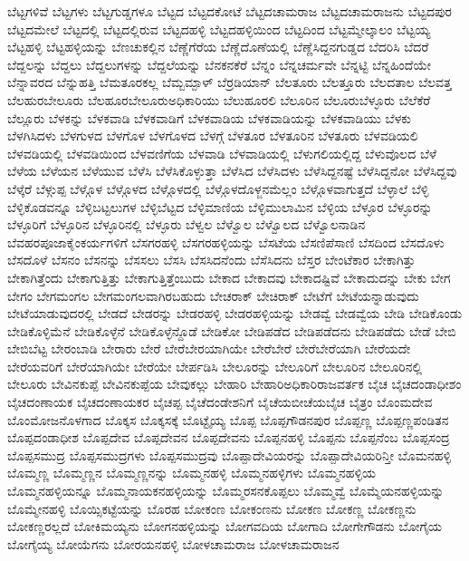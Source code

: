 {ಬೆಟ್ಟಗಳಿವೆ
ಬೆಟ್ಟಗಳು
ಬೆಟ್ಟಗುಡ್ಡಗಳೂ
ಬೆಟ್ಟದ
ಬೆಟ್ಟದಕೋಟೆ
ಬೆಟ್ಟದಚಾಮರಾಜ
ಬೆಟ್ಟದಚಾಮರಾಜನು
ಬೆಟ್ಟದಪುರ
ಬೆಟ್ಟದಮೇಲೆ
ಬೆಟ್ಟದಲ್ಲಿ
ಬೆಟ್ಟದಲ್ಲಿರುವ
ಬೆಟ್ಟದಹಳ್ಳಿ
ಬೆಟ್ಟದಹಳ್ಳಿಯಿಂದ
ಬೆಟ್ಟದಿಂದ
ಬೆಟ್ಟಮ್ಮೇಲ್ಕಾಲಂ
ಬೆಟ್ಟಯ್ಯ
ಬೆಟ್ಟಹಳ್ಳಿ
ಬೆಟ್ಟಹಳ್ಳಿಯನ್ನು
ಬೆಣಚುಕಲ್ಲಿನ
ಬೆಣ್ಣೆಗೆರೆಯ
ಬೆಣ್ಣೆದೊಣೆಯಲ್ಲಿ
ಬೆಣ್ಣೆಸಿದ್ದನಗುಡ್ಡದ
ಬೆದರಿಸಿ
ಬೆದರೆ
ಬೆದ್ದಲನ್ನು
ಬೆದ್ದಲು
ಬೆದ್ದಲುಗಳನ್ನು
ಬೆದ್ದಲೆಯನ್ನು
ಬೆನಕನಕೆರೆ
ಬೆನ್ನಂ
ಬೆನ್ನಚರ್ಮವೇ
ಬೆನ್ನಟ್ಟಿ
ಬೆನ್ನಹಿಂದೆಯೇ
ಬೆನ್ನಾವರದ
ಬೆನ್ನುಹತ್ತಿ
ಬೆಮತೂರಕಲ್ಲ
ಬೆಮ್ಬಮ್ಪಾಳ್
ಬೆರ್ರಡಿಯಾನ್
ಬೆಲತೂರು
ಬೆಲತ್ತೂರು
ಬೆಲದತಾಲ
ಬೆಲವತ್ತ
ಬೆಲಹುರಬೇಲೂರು
ಬೆಲಹೂರಬೇಲೂರುಅಧಿಕಾರಿಯು
ಬೆಲುಹೂರಲಿ
ಬೆಲೂರಿನ
ಬೆಲೂರುಬೆಳ್ಳೂರು
ಬೆಲೆಕೆರೆ
ಬೆಲ್ಲೂರು
ಬೆಳಕನ್ನು
ಬೆಳಕವಾಡಿ
ಬೆಳಕವಾಡಿಗೆ
ಬೆಳಕವಾಡಿಯ
ಬೆಳಕವಾಡಿಯನ್ನು
ಬೆಳಕವಾಡಿಯು
ಬೆಳಕು
ಬೆಳಗಿಸಿದಳು
ಬೆಳಗುಳದ
ಬೆಳಗೊಳ
ಬೆಳಗೊಳದ
ಬೆಳಗ್ಗೆ
ಬೆಳತೂರ
ಬೆಳತೂರಿನ
ಬೆಳತೂರು
ಬೆಳವಡಿಯಲಿ
ಬೆಳವಡಿಯಲ್ಲಿ
ಬೆಳವಡಿಯಿಂದ
ಬೆಳವಣಿಗೆಯ
ಬೆಳವಾಡಿ
ಬೆಳವಾಡಿಯಲ್ಲಿ
ಬೆಳುಗಲಿಯಲ್ಲಿದ್ದ
ಬೆಳುವೊಲದ
ಬೆಳೆ
ಬೆಳೆಯ
ಬೆಳೆಯನ
ಬೆಳೆಯುವ
ಬೆಳೆಸಿ
ಬೆಳೆಸಿಕೊಳ್ಳುತ್ತಾ
ಬೆಳೆಸಿದ
ಬೆಳೆಸಿದಳು
ಬೆಳೆಸಿದ್ದನಷ್ಟೆ
ಬೆಳೆಸಿದ್ದನೋ
ಬೆಳೆಸಿದ್ದವು
ಬೆಳ್ಕೆರೆ
ಬೆಳ್ಗುಪ್ಪ
ಬೆಳ್ಗೊಳ
ಬೆಳ್ಗೊಳದ
ಬೆಳ್ಗೊಳದಲ್ಲಿ
ಬೆಳ್ಗೊಳದೊಳ್ಜನಮೆಲ್ಲಂ
ಬೆಳ್ಗೊಳವಾಗುತ್ತದೆ
ಬೆಳ್ಳಾಲೆ
ಬೆಳ್ಳಿ
ಬೆಳ್ಳಿಕೊಡವನ್ನೂ
ಬೆಳ್ಳಿಬಟ್ಟಲುಗಳ
ಬೆಳ್ಳಿಬೆಟ್ಟದ
ಬೆಳ್ಳಿಮಾಣಿಯ
ಬೆಳ್ಳಿಮುಲಾಮಿನ
ಬೆಳ್ಳಿಯ
ಬೆಳ್ಳೂರ
ಬೆಳ್ಳೂರನ್ನು
ಬೆಳ್ಳೂರಿಗೆ
ಬೆಳ್ಳೂರಿನ
ಬೆಳ್ಳೂರಿನಲ್ಲಿ
ಬೆಳ್ಳೂರು
ಬೆಳ್ವಲ
ಬೆಳ್ವೊಲ
ಬೆಳ್ವೊಲದ
ಬೆಳ್ವೊಲನಾಡಿನ
ಬೆವಹರಪೂಜಾಕೈಂಕರ್ಯಗಳಿಗೆ
ಬೆಸಗರಹಳ್ಳಿ
ಬೆಸಗರಹಳ್ಳಿಯನ್ನು
ಬೆಸಟೆಯ
ಬೆಸಣಿಪೆಸಾಣಿ
ಬೆಸದಿಂದ
ಬೆಸದೊಳು
ಬೆಸದೊಳೆ
ಬೆಸನಂ
ಬೆಸನನ್ನು
ಬೆಸಸಲು
ಬೆಸಸಿ
ಬೆಸಸಿದನೆಂದು
ಬೆಸೆಸಿದನು
ಬೆಸ್ತರ
ಬೇಂಟೆಕಾರ
ಬೇಕಾಗಿತ್ತು
ಬೇಕಾಗಿತ್ತೆಂದು
ಬೇಕಾಗುತ್ತಿತ್ತು
ಬೇಕಾಗುತ್ತಿತ್ತೆಂಬುದು
ಬೇಕಾದ
ಬೇಕಾದವು
ಬೇಕಾದಷ್ಟಿವೆ
ಬೇಕಾದುದನ್ನು
ಬೇಕು
ಬೇಗ
ಬೇಗಂ
ಬೇಗಮಂಗಲ
ಬೇಗಮಂಗಲವಾಗಿರಬಹುದು
ಬೇಚರಾಕ್
ಬೇಚಿರಾಕ್
ಬೇಟೆಗೆ
ಬೇಟೆಯನ್ನಾಡುವುದು
ಬೇಟೆಯಾಡುವುದರಲ್ಲಿ
ಬೇಡದೆ
ಬೇಡರನ್ನು
ಬೇಡರಹಳ್ಳಿ
ಬೇಡರಹಳ್ಳಿಯನ್ನು
ಬೇಡವ್ವೆ
ಬೇಡವ್ವೆಯ
ಬೇಡಿ
ಬೇಡಿಕೊಂಡು
ಬೇಡಿಕೊಳ್ಳಿಮೆನೆ
ಬೇಡಿಕೊಳ್ಳೆನೆ
ಬೇಡಿಕೊಳ್ಳೆನ್ದೊಡೆ
ಬೇಡಿಕೋ
ಬೇಡಿಪಡೆದ
ಬೇಡಿಪಡೆದನು
ಬೇಡಿಪಡೆದು
ಬೇಡೆ
ಬೇಬಿ
ಬೇಬಿಬೆಟ್ಟ
ಬೇರಂಬಾಡಿ
ಬೇರಾರು
ಬೇರೆ
ಬೇರೆಬೇರಯಾಗಿಯೇ
ಬೇರೆಬೇರೆ
ಬೇರೆಬೇರೆಯಾಗಿ
ಬೇರೆಯದೇ
ಬೇರೆಯವರಿಗೆ
ಬೇರೆಯಾಗಿಯೇ
ಬೇರೆಯೇ
ಬೇರ್ಪಡಿಸಿ
ಬೇಲೂರನ್ನು
ಬೇಲೂರಿಗೆ
ಬೇಲೂರಿನ
ಬೇಲೂರಿನಲ್ಲಿ
ಬೇಲೂರು
ಬೇವಿನಕುಪ್ಪೆ
ಬೇವಿನಕುಪ್ಪೆಯ
ಬೇವುಕಲ್ಲು
ಬೇಹಾರಿ
ಬೇಹಾರಿಅಧಿಕಾರಿರಾಜವರ್ತಕ
ಬೈಚ
ಬೈಚದಂಡಾಧೀಶಂ
ಬೈಚದಂಣಾಯಕ
ಬೈಚದಂಣಾಯಕರ
ಬೈಚಪ್ಪ
ಬೈಚೆದಂಡೇಶನಿಗೆ
ಬೈಚೆಯಬೀಚೆಯಬೈಚ
ಬೈತ್ರಂ
ಬೊಂಮದೇವ
ಬೊಂಮೋಜನೊಳಗಾದ
ಬೊಕ್ಕಸ
ಬೊಕ್ಕಸಕ್ಕೆ
ಬೊಟ್ಟೈಯ್ಯ
ಬೊಪ್ಪ
ಬೊಪ್ಪಗೌಡನಪುರ
ಬೊಪ್ಪಣ್ಣ
ಬೊಪ್ಪಣ್ಣಪಂಡಿತನ
ಬೊಪ್ಪದಂಡಾಧೀಶ
ಬೊಪ್ಪದೇವ
ಬೊಪ್ಪದೇವನ
ಬೊಪ್ಪದೇವನು
ಬೊಪ್ಪನಹಳ್ಳಿ
ಬೊಪ್ಪನು
ಬೊಪ್ಪನೆಂಬ
ಬೊಪ್ಪಸಂದ್ರ
ಬೊಪ್ಪಸಮುದ್ರ
ಬೊಪ್ಪಸಮುದ್ರಗಳು
ಬೊಪ್ಪಸಮುದ್ರವು
ಬೊಪ್ಪಾದೇವಿಯರನ್ನು
ಬೊಪ್ಪಾದೇವಿಯರಿನ್ತೀ
ಬೊಮನಹಳ್ಳಿ
ಬೊಮ್ಮಣ್ಣ
ಬೊಮ್ಮಣ್ಣನ
ಬೊಮ್ಮಣ್ಣನನ್ನು
ಬೊಮ್ಮನಹಳ್ಳಿ
ಬೊಮ್ಮನಹಳ್ಳಿಗಳು
ಬೊಮ್ಮನಹಳ್ಳಿಯ
ಬೊಮ್ಮನಹಳ್ಳಿಯನ್ನೂ
ಬೊಮ್ಮನಾಯಕನಹಳ್ಳಿಯನ್ನು
ಬೊಮ್ಮರಸನಕೊಪ್ಪಲು
ಬೊಮ್ಮವ್ವೆ
ಬೊಮ್ಮೆಯನಹಳ್ಳಿಯನ್ನು
ಬೊಮ್ಮೇನಹಳ್ಳಿ
ಬೊಯ್ಸಿಕಟ್ಟೆಯನ್ನು
ಬೊರಹ
ಬೋಕಂಣ
ಬೋಕಂಣನು
ಬೋಕಣ
ಬೋಕಣ್ಣ
ಬೋಕಣ್ಣನು
ಬೋಕಣ್ಣರಲ್ಲದೆ
ಬೋಕಿಮಯ್ಯನು
ಬೋಗನಹಳ್ಳಿಯನ್ನು
ಬೋಗವದಿಯ
ಬೋಗಾದಿ
ಬೋಗೇಗೌಡನು
ಬೋಗೈಯ
ಬೋಗೈಯ್ಯ
ಬೋಯೆಗನು
ಬೋರಯನಹಳ್ಳಿ
ಬೋಳಚಾಮರಾಜ
ಬೋಳಚಾಮರಾಜನ
}
